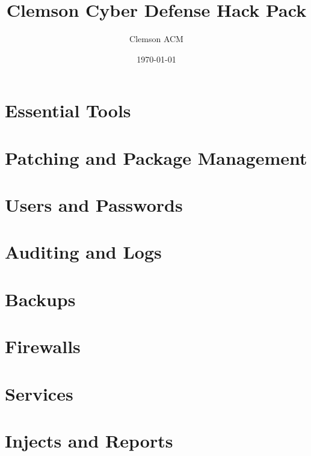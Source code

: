 \documentclass[letterpaper, 10pt]{report}
\title{Clemson Cyber Defense Hack Pack}
\author{Clemson ACM}
\date{\today}
\begin{document}
\maketitle





\tableofcontents

\chapter{Essential Tools}




\chapter{Patching and Package Management}

\chapter{Users and Passwords}





\chapter{Auditing and Logs}

\chapter{Backups}

\chapter{Firewalls}



\chapter{Services}




\chapter{Injects and Reports}




\printindex


\end{document}
